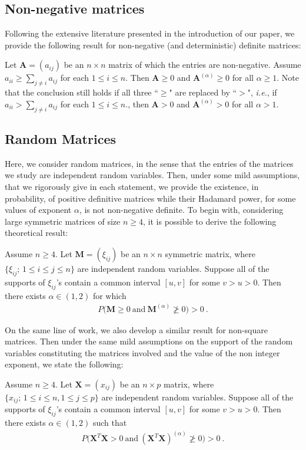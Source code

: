 \documentclass[conference,letterpaper]{IEEEtran}
\numberwithin{equation}{section}
\newcommand{\lbl}{\label}
\newcommand{\beaa}{\begin{eqnarray*}}
\newcommand{\eeaa}{\end{eqnarray*}}
\begin{document}
\subsection{Non-negative matrices}
Following the extensive literature presented in the introduction of our paper, we provide the following result for non-negative (and deterministic) definite matrices:

\begin{theo}\lbl{th:th1} Let $\mathbf{A}=(a_{ij})$ be an $n\times n$ matrix of which the entries are non-negative. Assume $a_{ii}\geq  \sum_{j\ne i}a_{ij}$ for each $1\leq i\leq n.$ Then $\mathbf{A} \geq 0$ and $\mathbf{A}^{(\alpha)}\geq  0$ for all $\alpha\geq 1.$ 
Note that the conclusion still holds if all three ``$\geq$" are replaced by ``$>$", \textit{i.e.}, if $a_{ii} >  \sum_{j\ne i}a_{ij}$ for each $1\leq i\leq n.$, then $\mathbf{A} > 0$ and $\mathbf{A}^{(\alpha)}>  0$ for all $\alpha> 1.$ 
\end{theo}


\subsection{Random Matrices}
Here, we consider random matrices, in the sense that the entries of the matrices we study are independent random variables.
Then, under some mild assumptions, that we rigorously give in each statement, we provide the existence, in probability, of positive definitive matrices while their Hadamard power, for some values of exponent $\alpha$, is not non-negative definite.
To begin with, considering large symmetric matrices of size $n \geq 4$, it is possible to derive the following theoretical result:
\begin{theo}\lbl{th:th2} Assume $n\geq 4$.   Let $\mathbf{M}=(\xi_{ij})$ be an $n\times n$ symmetric matrix, where $\{\xi_{ij};\, 1\leq i \leq j \leq n\}$ are independent random variables. 
Suppose all of the supports of $\xi_{ij}$'s contain  a common interval $[u, v]$ for some $v>u>0$. Then there exists $\alpha \in (1, 2)$ for which
\beaa
P\big(\mathbf{M}\geq 0\ \mbox{and}\ \mathbf{M}^{(\alpha)} \ngeqslant 0\big)>0 \ .
\eeaa
\end{theo}

On the same line of work, we also develop a similar result for non-square matrices. Then under the same mild assumptions on the support of the random variables constituting the matrices involved and the value of the non integer exponent, we state the following:
\begin{theo}\lbl{th:th3} Assume $n\geq 4$.   Let $\mathbf{X}=(x_{ij})$ be an $n\times p$  matrix, where $\{x_{ij};\, 1\leq i \leq n, 1\leq j \leq p\}$ are independent random variables. Suppose all of the supports of $\xi_{ij}$'s contain  a common interval $[u, v]$ for some $v>u>0$. Then there exists $\alpha \in (1, 2)$ such that
\beaa
P\big(\mathbf{X}^T\mathbf{X}>0\ \mbox{and}\ (\mathbf{X}^T\mathbf{X})^{(\alpha)}\ngeqslant 0\big)>0 \ .
\eeaa
\end{theo}
\end{document}

